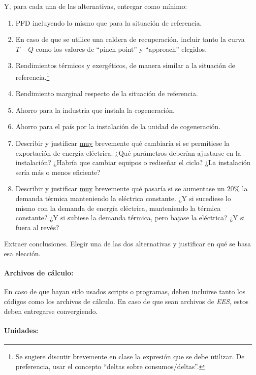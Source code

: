 Y, para cada una de las alternativas, entregar como mínimo:
\begin{enumerate}
    \item PFD incluyendo lo mismo que para la situación de referencia.
    \item En caso de que se utilice una caldera de recuperación, incluir tanto la curva $T-Q$ como los valores de ``pinch point'' y ``approach'' elegidos.
    \item Rendimientos térmicos y exergéticos, de manera similar a la situación de referencia.\footnote{Se sugiere discutir brevemente en clase la expresión que se debe utilizar. De preferencia, usar el concepto ``deltas sobre consumos/deltas''.}
    \item Rendimiento marginal respecto de la situación de referencia.
    \item Ahorro para la industria que instala la cogeneración.
    \item Ahorro para el país por la instalación de la unidad de cogeneración.
    \item Describir y justificar \underline{muy} brevemente qué cambiaría si se permitiese la exportación de energía eléctrica. ¿Qué parámetros deberían ajustarse en la instalación? ¿Habría que cambiar equipos o rediseñar el ciclo? ¿La instalación sería más o menos eficiente?
    \item Describir y justificar \underline{muy} brevemente qué pasaría si se aumentase un $20\%$ la demanda térmica manteniendo la eléctrica constante. ¿Y si sucediese lo mismo con la demanda de energía eléctrica, manteniendo la térmica constante? ¿Y si subiese la demanda térmica, pero bajase la eléctrica? ¿Y si fuera al revés?
\end{enumerate}

Extraer conclusiones. Elegir una de las dos alternativas y justificar en qué se basa esa elección.

\paragraph{Archivos de cálculo:}

En caso de que hayan sido usados scripts o programas, deben incluirse tanto los códigos como los archivos de cálculo. En caso de que sean archivos de \textit{EES}, estos deben entregarse convergiendo.

\paragraph{Unidades:}


